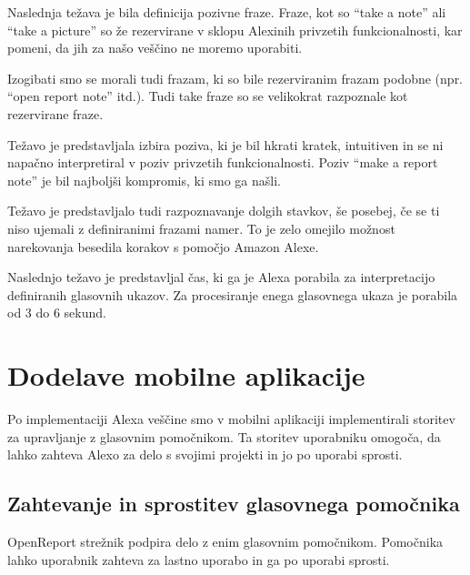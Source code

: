 \documentclass[a4paper, 12pt]{book}
\begin{document}
Naslednja težava je bila definicija pozivne fraze.
Fraze, kot so \enquote{take a note} ali \enquote{take a picture} so že rezervirane v sklopu Alexinih privzetih funkcionalnosti, kar pomeni, da jih za našo veščino ne moremo uporabiti.

Izogibati smo se morali tudi frazam, ki so bile rezerviranim frazam podobne (npr. \enquote{open report note} itd.).
Tudi take fraze so se velikokrat razpoznale kot rezervirane fraze.

Težavo je predstavljala izbira poziva, ki je bil hkrati kratek, intuitiven in se ni napačno interpretiral v poziv privzetih funkcionalnosti.
Poziv \enquote{make a report note} je bil najboljši kompromis, ki smo ga našli.

Težavo je predstavljalo tudi razpoznavanje dolgih stavkov, še posebej, če se ti niso ujemali z definiranimi frazami namer.
To je zelo omejilo možnost narekovanja besedila korakov s pomočjo Amazon Alexe.

Naslednjo težavo je predstavljal čas, ki ga je Alexa porabila za interpretacijo definiranih glasovnih ukazov.
Za procesiranje enega glasovnega ukaza je porabila od 3 do 6 sekund.












\section{Dodelave mobilne aplikacije}

Po implementaciji Alexa veščine smo v mobilni aplikaciji implementirali storitev za upravljanje z glasovnim pomočnikom.
Ta storitev uporabniku omogoča, da lahko zahteva Alexo za delo s svojimi projekti in jo po uporabi sprosti.


\subsection{Zahtevanje in sprostitev glasovnega pomočnika}

OpenReport strežnik podpira delo z enim glasovnim pomočnikom.
Pomočnika lahko uporabnik {zahteva} za lastno uporabo in ga po uporabi {sprosti}.
\end{document}
